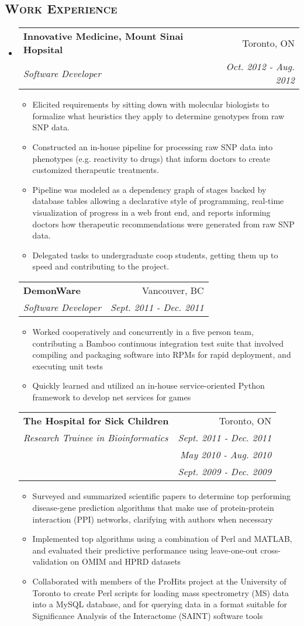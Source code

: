\documentclass[letterpaper,11pt]{article}
\makeatletter
\newcommand{\company}[1]{
    \textbf{#1}
}
\newcommand{\heading}[1]{
    \textsc{\textbf{#1}}
}
\newcommand*\resheading[1]{\subsection*{\heading{#1}}\vspace{0.3em}\nopagebreak[4]}
\newcommand{\resitem}[1]{\item #1 \vspace{-2pt}}
\newcommand{\ressubheading}[4]{
\begin{tabular*}{6.5in}{l@{\extracolsep{\fill}}r}
    
		\company{#1} & #2 \\
		\textit{#3} & \textit{#4} \\
\end{tabular*}\vspace{-6pt}}
\newcommand{\sickkids}[6]{
\begin{tabular*}{6.5in}{l@{\extracolsep{\fill}}r}
		\company{#1} & #2 \\
		\textit{#3} & \textit{#4} \\
		 & \textit{#5} \\
		 & \textit{#6} \\
\end{tabular*}\vspace{-6pt}}
\makeatother
\begin{document}
\resheading{Work Experience}
\begin{itemize}
\item

	\ressubheading{Innovative Medicine, Mount Sinai Hopsital}{Toronto, ON}{Software Developer}{Oct. 2012 - Aug. 2012}
	\begin{itemize}
		\resitem{
            Elicited requirements by sitting down with molecular biologists to formalize 
            what heuristics they apply to determine genotypes from raw SNP data.
        }
		\resitem{
            Constructed an in-house pipeline for processing raw SNP data into phenotypes 
            (e.g. reactivity to drugs) that inform doctors to create customized therapeutic 
            treatments.  
        }
        \resitem{
            Pipeline was modeled as a dependency graph of stages backed by database 
            tables allowing a declarative style of programming, real-time 
            visualization of progress in a web front end, and reports informing 
            doctors how therapeutic recommendations were generated from raw SNP data.
        }
        \resitem{
            Delegated tasks to undergraduate coop students, getting them up to speed and 
            contributing to the project.
        }
	\end{itemize}

	\ressubheading{DemonWare}{Vancouver, BC}{Software Developer}{Sept. 2011 - Dec. 2011}
	\begin{itemize}
		\resitem{
            Worked cooperatively and concurrently in a five person team, contributing a 
            Bamboo continuous integration test suite that involved compiling and packaging 
            software into RPMs for rapid deployment, and executing unit tests
        }
        \resitem{
            Quickly learned and utilized an in-house service-oriented Python framework to 
            develop net services for games
        }
	\end{itemize}

	\sickkids{The Hospital for Sick Children}{Toronto, ON}{Research Trainee in 
    Bioinformatics}{Sept. 2011 - Dec. 2011}{May 2010 - Aug. 2010}{Sept. 2009 - Dec. 2009}
	\begin{itemize}
		\resitem{
             Surveyed and summarized scientific papers to determine top performing 
             disease-gene prediction algorithms that make use of protein-protein interaction 
             (PPI) networks, clarifying with authors when necessary
        }
        \resitem{
             Implemented top algorithms using a combination of Perl and MATLAB, and 
             evaluated their predictive performance using leave-one-out cross-validation on 
             OMIM and HPRD datasets
        }
        \resitem{
             Collaborated with members of the ProHits project at the University of Toronto 
             to create Perl scripts for loading mass spectrometry (MS) data into a MySQL 
             database, and for querying data in a format suitable for Significance Analysis 
             of the Interactome (SAINT) software tools
        }
	\end{itemize}

\end{itemize}
\end{document}
